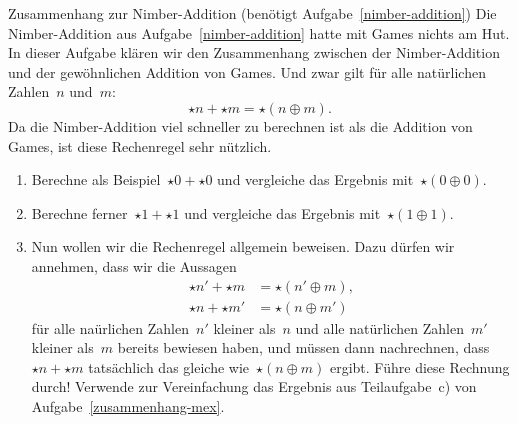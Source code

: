 \documentclass{../zirkelblatt}
\begin{document}
\begin{aufgabe}{Zusammenhang zur Nimber-Addition (benötigt
Aufgabe~\ref{nimber-addition})}
\label{nimber-addition-surreal}
Die Nimber-Addition aus Aufgabe~\ref{nimber-addition} hatte mit Games nichts am
Hut. In dieser Aufgabe klären wir den Zusammenhang zwischen der Nimber-Addition
und der gewöhnlichen Addition von Games. Und zwar gilt für alle natürlichen
Zahlen~$n$ und~$m$:
\[ \star n + \star m = \star(n \oplus m). \]
Da die Nimber-Addition viel schneller zu berechnen ist als die Addition von
Games, ist diese Rechenregel sehr nützlich.
\begin{enumerate}
\item Berechne als Beispiel~$\star 0 + \star 0$ und vergleiche das Ergebnis
mit~$\star (0 \oplus 0)$.
\item Berechne ferner~$\star 1 + \star 1$ und vergleiche das Ergebnis
mit~$\star (1 \oplus 1)$.
\item Nun wollen wir die Rechenregel allgemein beweisen. Dazu dürfen wir
annehmen, dass wir die Aussagen
\begin{align*}
  \star n' + \star m &= \star(n' \oplus m), \\
  \star n + \star m' &= \star(n \oplus m')
\end{align*}
für alle naürlichen Zahlen~$n'$ kleiner als~$n$ und alle natürlichen
Zahlen~$m'$ kleiner als~$m$ bereits bewiesen haben, und müssen dann nachrechnen,
dass~$\star n + \star m$ tatsächlich das gleiche wie~$\star(n \oplus m)$
ergibt. Führe diese Rechnung durch! Verwende zur Vereinfachung das Ergebnis aus
Teilaufgabe~c) von Aufgabe~\ref{zusammenhang-mex}.
\end{enumerate}
\end{aufgabe}
\end{document}

